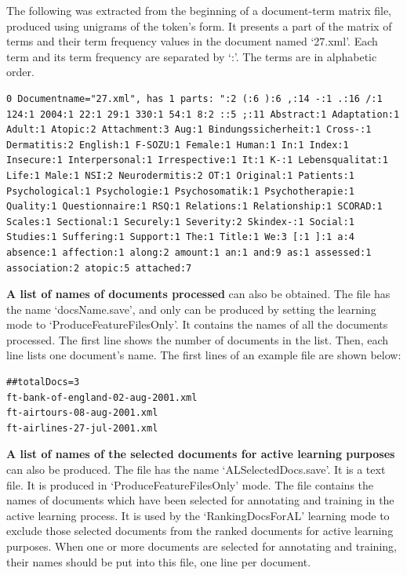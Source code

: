 The following was extracted from the beginning of a document-term matrix file,
produced using unigrams of the token's form. It presents a part of the matrix of
terms and their term frequency values in the document named `27.xml'. Each term
and its term frequency are separated by `:'. The terms are in alphabetic order.

\begin{small}\begin{verbatim}
0 Documentname="27.xml", has 1 parts: ":2 (:6 ):6 ,:14 -:1 .:16 /:1
124:1 2004:1 22:1 29:1 330:1 54:1 8:2 ::5 ;:11 Abstract:1 Adaptation:1
Adult:1 Atopic:2 Attachment:3 Aug:1 Bindungssicherheit:1 Cross-:1
Dermatitis:2 English:1 F-SOZU:1 Female:1 Human:1 In:1 Index:1
Insecure:1 Interpersonal:1 Irrespective:1 It:1 K-:1 Lebensqualitat:1
Life:1 Male:1 NSI:2 Neurodermitis:2 OT:1 Original:1 Patients:1
Psychological:1 Psychologie:1 Psychosomatik:1 Psychotherapie:1
Quality:1 Questionnaire:1 RSQ:1 Relations:1 Relationship:1 SCORAD:1
Scales:1 Sectional:1 Securely:1 Severity:2 Skindex-:1 Social:1
Studies:1 Suffering:1 Support:1 The:1 Title:1 We:3 [:1 ]:1 a:4
absence:1 affection:1 along:2 amount:1 an:1 and:9 as:1 assessed:1
association:2 atopic:5 attached:7
\end{verbatim}\end{small}

{\bf A list of names of documents processed} can also be obtained. The file has
the name `docsName.save', and only can be produced by setting the learning
mode to `ProduceFeatureFilesOnly'. It contains the names of all the documents
processed. The first line shows the number of documents in the list. Then, each
line lists one document's name.  The first lines of an example file are shown
below:

\begin{small}\begin{verbatim}
##totalDocs=3
ft-bank-of-england-02-aug-2001.xml
ft-airtours-08-aug-2001.xml
ft-airlines-27-jul-2001.xml
\end{verbatim}\end{small}

{\bf A list of names of the selected documents for active learning purposes} can
also be produced. The file has the name `ALSelectedDocs.save'. It is a text
file. It is produced in `ProduceFeatureFilesOnly' mode. The file contains
the names of documents which have been selected for annotating and training in the
active learning process.  It is used by the `RankingDocsForAL' learning mode to
exclude those selected documents from the ranked documents for active learning
purposes. When one or more documents are selected for annotating and training,
their names should be put into this file, one line per document.

